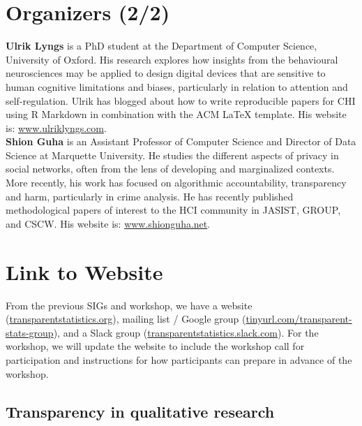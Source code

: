 \documentclass[sigchi-a, authorversion]{acmart}
\begin{document}
\begin{sidebar}
\vspace{-5.5cm}
\section{Organizers (2/2)}

\textbf{Ulrik Lyngs} is a PhD student at the Department of Computer Science, University of Oxford. His research explores how insights from the behavioural neurosciences may be applied to design digital devices that are sensitive to human cognitive limitations and biases, particularly in relation to attention and self-regulation.  Ulrik has blogged about how to write reproducible papers for CHI using R Markdown in combination with the ACM LaTeX template. His website is: \url{www.ulriklyngs.com}. \\
 
\textbf{Shion Guha} is an Assistant Professor of Computer Science and Director of Data Science at Marquette University. He studies the different aspects of privacy in social networks, often from the lens of developing and marginalized contexts. More recently, his work has focused on algorithmic accountability, transparency and harm, particularly in crime analysis. He has recently published methodological papers of interest to the HCI community in JASIST, GROUP, and CSCW. His website is: \url{www.shionguha.net}. \\

\section{Link to Website}
From the previous SIGs and workshop, we have a website (\url{transparentstatistics.org}),  mailing list / Google group (\url{tinyurl.com/transparent-stats-group}), and a Slack group (\url{transparentstatistics.slack.com}). For the workshop, we will update the website to include the workshop call for participation and instructions for how participants can prepare in advance of the workshop.

\end{sidebar}



\subsection{Transparency in qualitative research}
\end{document}
